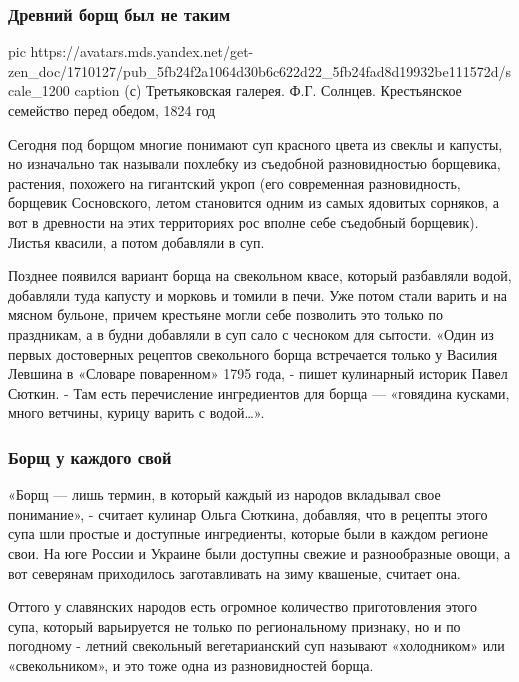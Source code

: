 \subsubsection{Древний борщ был не таким}

\ifcmt
  pic https://avatars.mds.yandex.net/get-zen_doc/1710127/pub_5fb24f2a1064d30b6c622d22_5fb24fad8d19932be111572d/scale_1200
  caption (с) Третьяковская галерея. Ф.Г. Солнцев. Крестьянское семейство перед обедом, 1824 год
\fi

Сегодня под борщом многие понимают суп красного цвета из свеклы и капусты, но
изначально так называли похлебку из съедобной разновидностью борщевика,
растения, похожего на гигантский укроп (его современная разновидность, борщевик
Сосновского, летом становится одним из самых ядовитых сорняков, а вот в
древности на этих территориях рос вполне себе съедобный борщевик). Листья
квасили, а потом добавляли в суп.

Позднее появился вариант борща на свекольном квасе, который разбавляли водой,
добавляли туда капусту и морковь и томили в печи. Уже потом стали варить и на
мясном бульоне, причем крестьяне могли себе позволить это только по праздникам,
а в будни добавляли в суп сало с чесноком для сытости. «Один из первых
достоверных рецептов свекольного борща встречается только у Василия Левшина в
«Словаре поваренном» 1795 года, -
пишет
кулинарный историк Павел Сюткин. - Там есть перечисление ингредиентов для борща
— «говядина кусками, много ветчины, курицу варить с водой…».  

\subsubsection{Борщ у каждого свой}

«Борщ — лишь термин, в который каждый из народов вкладывал свое понимание», -
считает кулинар Ольга Сюткина, добавляя, что в рецепты этого супа шли простые и
доступные ингредиенты, которые были в каждом регионе свои. На юге России и
Украине были доступны свежие и разнообразные овощи, а вот северянам приходилось
заготавливать на зиму квашеные, считает она.

Оттого у славянских народов есть огромное количество приготовления этого супа,
который варьируется не только по региональному признаку, но и по погодному -
летний свекольный вегетарианский суп называют «холодником» или «свекольником»,
и это тоже одна из разновидностей борща.

